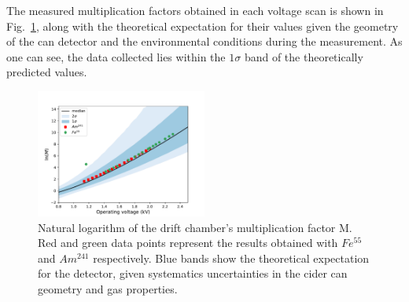 



The measured multiplication factors obtained in each voltage scan is shown in Fig.~\ref{final_lnm}, along with the theoretical expectation for their values given the geometry of the can detector and the environmental conditions during the measurement. As one can see, the data collected lies within the $1\sigma$ band of the theoretically predicted values.

\begin{figure}[htb]
  \includegraphics[width=0.5\textwidth]{graphics/lnM_final_plot.pdf}
  \caption{Natural logarithm of the drift chamber's multiplication factor M. Red and green data points represent the results obtained with $Fe^{55}$ and $Am^{241}$ respectively. Blue bands show the theoretical expectation for the detector, given systematics uncertainties in the cider can geometry and gas properties.}
  \label{final_lnm}
\end{figure}
